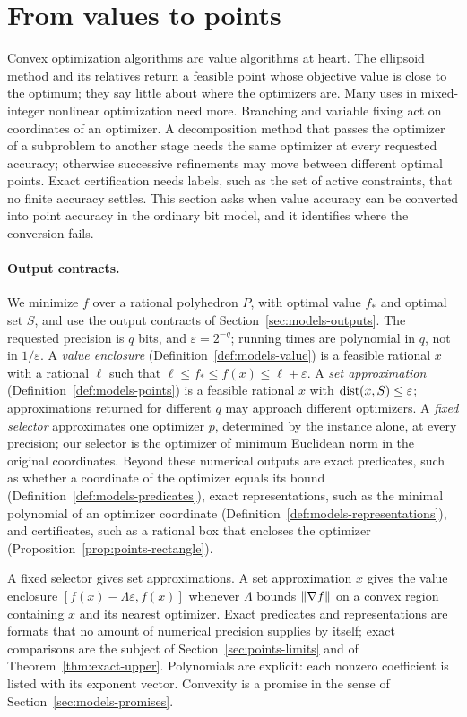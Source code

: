\section{From values to points}\label{sec:points}

Convex optimization algorithms are value algorithms at heart. The ellipsoid
method and its relatives return a feasible point whose objective value is
close to the optimum; they say little about where the optimizers are. Many
uses in mixed-integer nonlinear optimization need more. Branching and
variable fixing act on coordinates of an optimizer. A decomposition method
that passes the optimizer of a subproblem to another stage needs the same
optimizer at every requested accuracy; otherwise successive refinements may
move between different optimal points. Exact certification needs labels,
such as the set of active constraints, that no finite accuracy settles.
This section asks when value accuracy can be converted into point accuracy
in the ordinary bit model, and it identifies where the conversion fails.

\paragraph{Output contracts.}
We minimize $f$ over a rational polyhedron $P$, with optimal value $f_*$
and optimal set $S$, and use the output contracts of
Section~\ref{sec:models-outputs}. The requested precision is $q$ bits, and
$\varepsilon=2^{-q}$; running times are polynomial in $q$, not in
$1/\varepsilon$. A \emph{value enclosure} (Definition~\ref{def:models-value})
is a feasible rational $x$ with a rational $\ell$ such that
$\ell\le f_*\le f(x)\le\ell+\varepsilon$. A \emph{set approximation}
(Definition~\ref{def:models-points}) is a feasible rational $x$ with
$\operatorname{dist}(x,S)\le\varepsilon$; approximations returned for different $q$ may
approach different optimizers. A \emph{fixed selector} approximates one
optimizer $p$, determined by the instance alone, at every precision; our
selector is the optimizer of minimum Euclidean norm in the original
coordinates. Beyond these numerical outputs are exact predicates, such as
whether a coordinate of the optimizer equals its bound
(Definition~\ref{def:models-predicates}), exact representations, such as the
minimal polynomial of an optimizer coordinate
(Definition~\ref{def:models-representations}), and certificates, such as a
rational box that encloses the optimizer
(Proposition~\ref{prop:points-rectangle}).

A fixed selector gives set approximations. A set approximation $x$ gives the
value enclosure $[f(x)-\Lambda\varepsilon,f(x)]$ whenever $\Lambda$ bounds
$\left\lVert\nabla f\right\rVert$ on a convex region containing $x$ and its nearest
optimizer. Exact predicates and representations are formats that no amount
of numerical precision supplies by itself; exact comparisons are the
subject of Section~\ref{sec:points-limits} and of
Theorem~\ref{thm:exact-upper}. Polynomials are explicit: each nonzero
coefficient is listed with its exponent vector. Convexity is a promise in
the sense of Section~\ref{sec:models-promises}.

